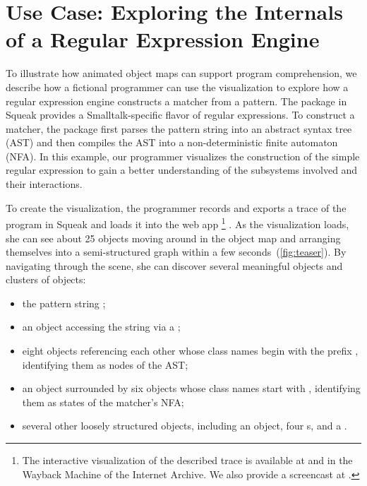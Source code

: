 \section{Use Case: Exploring the Internals of a Regular Expression Engine}
\label{sec:use_case}

To illustrate how animated object maps can support program comprehension, we describe how a fictional programmer can use the \tfd{} visualization to explore how a regular expression engine constructs a matcher from a pattern.
The  package in Squeak provides a Smalltalk-specific flavor of regular expressions.
To construct a matcher, the package first parses the pattern string into an abstract syntax tree (AST) and then compiles the AST into a non-deterministic finite automaton (NFA).
In this example, our programmer visualizes the construction of the simple regular expression  to gain a better understanding of the subsystems involved and their interactions.

To create the visualization, the programmer records and exports a trace of the program  in Squeak and loads it into the \tfd{} web app%
\footnote{
	The interactive visualization of the described trace is available at  and in the Wayback Machine of the Internet Archive.
	We also provide a screencast at .
}%
.
As the visualization loads, she can see about 25 objects moving around in the object map and arranging themselves into a semi-structured graph within a few seconds~(\cref{fig:teaser}).
By navigating through the scene, she can discover several meaningful objects and clusters of objects:

\begin{itemize}
	\item the pattern string ;
	\item an  object accessing the string via a ;
	\item eight objects referencing each other whose class names begin with the prefix , identifying them as nodes of the AST;
	\item an  object surrounded by six objects whose class names start with , identifying them as states of the matcher's NFA;
	\item several other loosely structured objects, including an  object, four s, and a .
\end{itemize}

